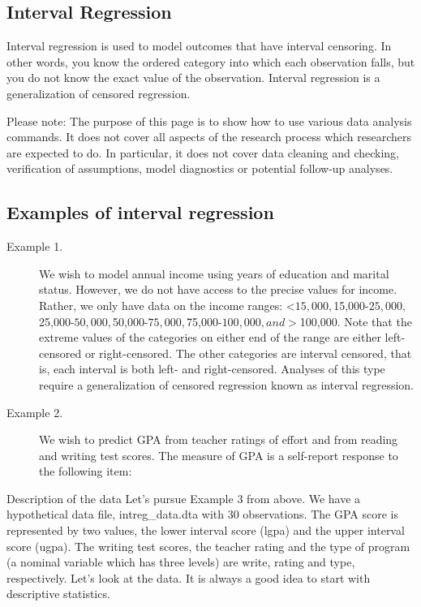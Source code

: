 
\subsection{Interval Regression}

Interval regression is used to model outcomes that have interval censoring.  In other words, you know the ordered category into which each observation falls, but you do not know the exact value of the observation.  Interval regression is a generalization of censored regression.

Please note: The purpose of this page is to show how to use various data analysis commands.  It does not cover all aspects of the research process which researchers are expected to do.  In particular, it does not cover data cleaning and checking, verification of assumptions, model diagnostics or potential follow-up analyses.

\subsection*{Examples of interval regression}

\begin{description}
\item[Example 1.]  We wish to model annual income using years of education and marital status.  However, we do not have access to the precise values for income.  Rather, we only have data on the income ranges: <$15,000, $15,000-$25,000, $25,000-$50,000, $50,000-$75,000, $75,000-$100,000, and >$100,000.  Note that the extreme values of the categories on either end of the range are either left-censored or right-censored.  The other categories are interval censored, that is, each interval is both left- and right-censored.  Analyses of this type require a generalization of censored regression known as interval regression.

\item[Example 2.]  We wish to predict GPA from teacher ratings of effort and from reading and writing test scores.  The measure of GPA is a self-report response to the following item:
\end{description}

Description of the data
Let's pursue Example 3 from above. We have a hypothetical data file, intreg_data.dta with 30 observations. The GPA score is represented by two values, the lower interval score (lgpa) and the upper interval score (ugpa). The writing test scores, the teacher rating and the type of program (a nominal variable which has three levels) are write, rating and type, respectively. Let's look at the data. It is always a good idea to start with descriptive statistics.

